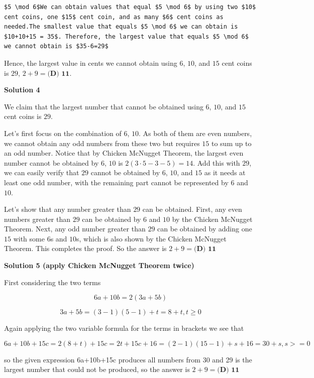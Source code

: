 \begin{enumerate}
\begin{verbatim}
$5 \mod 6$We can obtain values that equal $5 \mod 6$ by using two $10$ cent coins, one $15$ cent coin, and as many $6$ cent coins as needed.The smallest value that equals $5 \mod 6$ we can obtain is $10+10+15 = 35$. Therefore, the largest value that equals $5 \mod 6$ we cannot obtain is $35-6=29$
\end{verbatim}

Hence, the largest value in cents we cannot obtain using $6$, $10$, and $15$ cent coins is $29$, $2 + 9 = \boxed{\textbf{(D) 11}}$.

 



\textbf{Solution 4}

We claim that the largest number that cannot be obtained using $6$, $10$, and $15$ cent coins is $29$.

 Let's first focus on the combination of $6$, $10$. As both of them are even numbers, we cannot obtain any odd numbers from these two but requires $15$ to sum up to an odd number. Notice that by Chicken McNugget Theorem, the largest even number cannot be obtained by $6$, $10$ is $2(3\cdot 5-3-5)=14$. Add this with $29$, we can easily verify that $29$ cannot be obtained by $6$, $10$, and $15$ as it needs at least one odd number, with the remaining part cannot be represented by $6$ and $10$.

 Let's show that any number greater than $29$ can be obtained. First, any even numbers greater than $29$ can be obtained by $6$ and $10$ by the Chicken McNugget Theorem. Next, any odd number greater than $29$ can be obtained by adding one $15$ with some $6$s and $10$s, which is also shown by the Chicken McNugget Theorem. This completes the proof. So the answer is $2+9 = \boxed{\textbf{(D) 11}}$




\textbf{Solution 5 (apply Chicken McNugget Theorem twice)}

First considering the two terms 

 
 \[6a+10b = 2(3a+5b)\]

 \[3a+5b = (3-1)(5-1)+t = 8+t, t \geq 0\]

 Again applying the two variable formula for the terms in brackets we see that

 
 \[6a+10b+15c = 2(8+t)+15c = 2t+15c+16 = (2-1)(15-1)+s+16 = 30+s, s>=0\]

 so the given expression 6a+10b+15c produces all numbers from 30 and 29 is the largest number that could not be produced, so the answer is $2+9 = \boxed{\textbf{(D) 11}}$


\end{enumerate}
